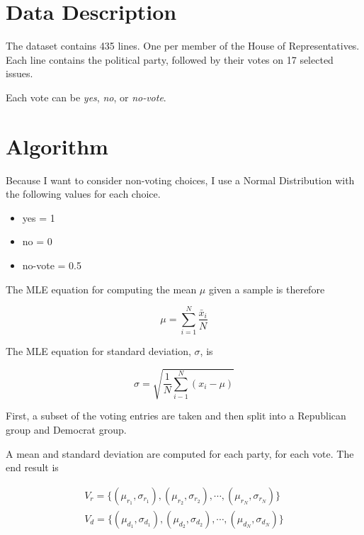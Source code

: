 \documentclass[12pt]{report}
\begin{document}
\section*{Data Description}

The dataset contains 435 lines.  One per member of the House of Representatives.  Each 
line contains the political party, followed by their votes on 17 selected issues.  

Each vote can be \emph{yes}, \emph{no}, or \emph{no-vote}.  


\section*{Algorithm}

Because I want to consider non-voting choices, I use a Normal Distribution with the following values
for each choice.

\begin{itemize}
\item[] yes = 1
\item[] no  = 0
\item[] no-vote = 0.5
\end{itemize}

The MLE equation for computing the mean $\mu$ given a sample is therefore

\begin{equation}
\mu = \sum_{i=1}^{N} \frac{\bar{x}_i}{N}
\end{equation}

The MLE equation for standard deviation, $\sigma$, is 

\begin{equation}
\sigma = \sqrt{\frac{1}{N} \sum_{i-1}^{N} \left( x_i - \mu \right)}
\end{equation}


First, a subset of the voting entries are taken and then split into a Republican group and 
Democrat group. 

A mean and standard deviation are computed for each party, for each vote.  The end result is

\begin{equation}
\begin{matrix}
V_{r} = \{ \left( \mu_{r_1}, \sigma_{r_1} \right), \left( \mu_{r_2}, \sigma_{r_2} \right), \cdots, \left( \mu_{r_N}, \sigma_{r_N} \right) \}\\
V_{d} = \{ \left( \mu_{d_1}, \sigma_{d_1} \right), \left( \mu_{d_2}, \sigma_{d_2} \right), \cdots, \left( \mu_{d_N}, \sigma_{d_N} \right) \}
\end{matrix}
\end{equation}
\end{document}
